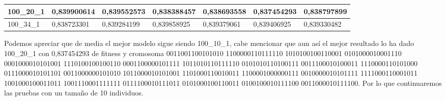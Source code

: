 \documentclass[12pt, spanish, pdftex]{UC3M_document}
\begin{document}
\begin{table}[H]
{\begin{tabular}{|l|l|l|l|l|l|l|}
			100\_20\_1                                                                           & \cellcolor[HTML]{F8696B}0,839900614                                            & \cellcolor[HTML]{FB8F73}0,839552573                                            & \cellcolor[HTML]{D8DF81}0,838388457                                            & \cellcolor[HTML]{FFEB84}0,838693558                                            & \cellcolor[HTML]{63BE7B}0,837454293                                            & \cellcolor[HTML]{8AC97D}0,838797899                                                \\ \hline
			100\_34\_1                                                                           & \cellcolor[HTML]{63BE7B}0,838723301                                            & \cellcolor[HTML]{E8E482}0,839284199                                            & \cellcolor[HTML]{F8696B}0,839858925                                            & \cellcolor[HTML]{FFEB84}0,839379061                                            & \cellcolor[HTML]{FFE483}0,839406925                                            & \cellcolor[HTML]{FFE082}0,839330482                                                \\ \hline
		\end{tabular}%
	}
\end{table}

Podemos apreciar que de media el mejor modelo sigue siendo 100\_10\_1, cabe mencionar que aun así el mejor resultado lo ha dado 100\_20\_1 con 0,837454293 de fitness y cromosoma 0011001100101010 1100000110111110 1010100100110001 0101000010001110 0001000010101001 1110100100100110 0001100000101111 1011010110111110 0101010110100111 0011100010100011 1110000110101000 0111000010101101 0011000000101010 1011000010101001 1101000110010011 1100001000000111 0010000010101111 1111000110001011 1001000100011011 1001110001111111 0111100010111011 0101000100110011 0100100010111100 0011000010111100. Por lo que continuaremos las pruebas con un tamaño de 10 individuos.
\pagebreak
\end{document}
